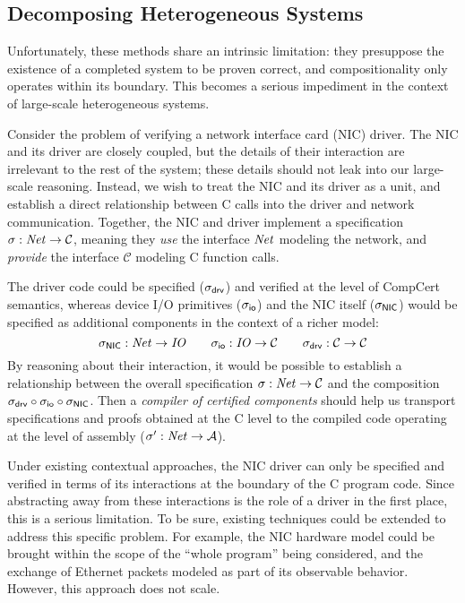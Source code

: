 
\subsection{Decomposing Heterogeneous Systems} %

Unfortunately,
these methods share an intrinsic limitation:
they presuppose the existence of a completed system
to be proven correct,
and compositionality only operates within its boundary.
This becomes a serious impediment
in the context of large-scale heterogeneous systems.

\begin{example} \label{ex:nicdriver} %
Consider the problem of verifying
a network interface card (NIC) driver.
The NIC and its driver are closely coupled,
but the details of their interaction
are irrelevant to the rest of the system;
these details should not leak into our large-scale reasoning.
Instead,
we wish to treat the NIC and its driver as a unit,
and establish a direct relationship between C calls into
the driver and network communication.
Together, the NIC and driver implement
a specification $\sigma :
\mathit{Net} \rightarrow \mathcal{C}$,
meaning they \emph{use} the interface $\mathit{Net}$
modeling the network,
and \emph{provide} the interface $\mathcal{C}$
modeling C function calls.

The driver code could be specified
($\sigma_{ \mathsf{drv} }$)
and verified
at the level of CompCert semantics,
whereas device I/O primitives
($\sigma_{ \mathsf{io} }$)
and the NIC itself
($\sigma_{ \mathsf{NIC} }$)
would be specified as additional components
in the context of a richer model:
\[
  \sigma_{ \mathsf{NIC} } : \mathit{Net} \rightarrow \mathit{IO}
  \qquad
  \sigma_{ \mathsf{io} } : \mathit{IO} \rightarrow \mathcal{C}
  \qquad
  \sigma_{ \mathsf{drv} } : \mathcal{C} \rightarrow \mathcal{C}
\]
By reasoning about their interaction,
it would be possible to establish a relationship between
the overall specification $\sigma : \mathit{Net} \rightarrow \mathcal{C}$ and
the composition
$\sigma_{ \mathsf{drv} } \circ \sigma_{ \mathsf{io} } \circ \sigma_{ \mathsf{NIC} }$.
Then a \emph{compiler of certified components}
should help us transport specifications and proofs
obtained at the C level %
to the compiled code operating at the level of assembly
($\sigma' : \mathit{Net} \rightarrow \mathcal{A}$).
\end{example}

Under existing contextual approaches,
the NIC driver can only be specified and verified in terms of
its interactions at the boundary of the C program code.
Since abstracting away from these interactions
is the role of a driver in the first place,
this is a serious limitation.
%
To be sure,
existing techniques could be extended
to address this specific problem.
For example,
the NIC hardware model could be brought
within the scope of the ``whole program'' being considered,
and the exchange of Ethernet packets
modeled as part of its observable behavior.
However, this approach does not scale.

